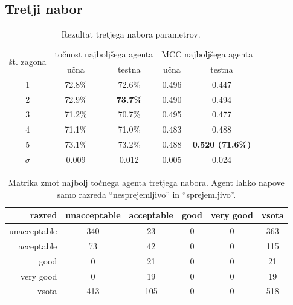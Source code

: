 \subsection{Tretji nabor}\label{subsec:dodatek-car-tretji-nabor}
\begin{table}[H]
    \begin{center}
        \begin{tabular}{|| c | c c || c c ||}
            \hline
            \multirow{2}{*}{št. zagona} & \multicolumn{2}{c||}{točnost najboljšega agenta} & \multicolumn{2}{c||}{MCC najboljšega agenta} \\ \cline{2-5}
            & učna   & testna          & učna  & testna                  \\
            \hline
            1        & 72.8\% & 72.6\%          & 0.496 & 0.447                   \\
            \hline
            2        & 72.9\% & \textbf{73.7\%} & 0.490 & 0.494                   \\
            \hline
            3        & 71.2\% & 70.7\%          & 0.495 & 0.477                   \\
            \hline
            4        & 71.1\% & 71.0\%          & 0.483 & 0.488                   \\
            \hline
            5        & 73.1\% & 73.2\%          & 0.488 & \textbf{0.520 (71.6\%)} \\
            \hline
            $\sigma$ & 0.009  & 0.012           & 0.005 & 0.024                   \\
            \hline
        \end{tabular}
    \end{center}
    \caption{Rezultat tretjega nabora parametrov.}
    \label{tab:car_result_3}
\end{table}

\begin{table}[H]
    \centering
    \begin{tabular}{||rccccc||}
        \hline
        razred       & unacceptable & acceptable & good & very good & vsota \\ \hline
        unacceptable & 340          & 23         & 0    & 0         & 363   \\ \hline
        acceptable   & 73           & 42         & 0    & 0         & 115   \\ \hline
        good         & 0            & 21         & 0    & 0         & 21    \\ \hline
        very good    & 0            & 19         & 0    & 0         & 19    \\ \hline
        vsota        & 413          & 105        & 0    & 0         & 518   \\ \hline
    \end{tabular}
    \caption{Matrika zmot najbolj točnega agenta tretjega nabora. Agent lahko napove samo razreda \enquote{nesprejemljivo} in \enquote{sprejemljivo}.}
    \label{tab:car_acc_3}
\end{table}

